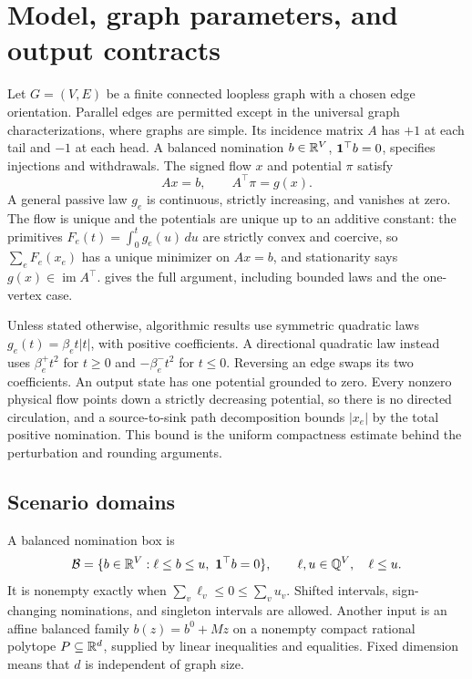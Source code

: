 \section{Model, graph parameters, and output contracts}
\label{sec:main-model}

Let $G=(V,E)$ be a finite connected loopless graph with a chosen edge
orientation. Parallel edges are permitted except in the universal graph
characterizations, where graphs are simple. Its incidence matrix $A$
has $+1$ at each tail and $-1$ at each head. A balanced nomination
$b\in\mathbb{R}^V$, $\mathbf{1}^\top b=0$, specifies injections and withdrawals.
The signed flow $x$ and potential $\pi$ satisfy
\begin{equation}
 Ax=b,\qquad A^\top\pi=g(x).
 \label{eq:main-state}
\end{equation}
A general passive law $g_e$ is continuous, strictly increasing, and
vanishes at zero. The flow is unique and the potentials are unique up
to an additive constant: the primitives
$F_e(t)=\int_0^t g_e(u)\,du$ are strictly convex and coercive, so
$\sum_e F_e(x_e)$ has a unique minimizer on $Ax=b$, and stationarity
says $g(x)\in\operatorname{im}A^\top$. 
gives the full argument, including bounded laws and the one-vertex case.

Unless stated otherwise, algorithmic results use symmetric quadratic
laws $g_e(t)=\beta_e t|t|$, with positive coefficients. A directional
quadratic law instead uses $\beta_e^+t^2$ for $t\ge0$ and
$-\beta_e^-t^2$ for $t\le0$. Reversing an edge swaps its two
coefficients. An output state has one potential grounded to zero.
Every nonzero physical flow points down a strictly decreasing potential,
so there is no directed circulation, and a source-to-sink path
decomposition bounds $|x_e|$ by the total positive nomination. This
bound is the uniform compactness estimate behind the perturbation and
rounding arguments.

\subsection{Scenario domains}

A balanced nomination box is
\begin{equation}
 \mathcal B=\{b\in\mathbb{R}^V:\ell\le b\le u,\ \mathbf{1}^\top b=0\},
 \qquad \ell,u\in\mathbb{Q}^V,\quad \ell\le u.
 \label{eq:main-box}
\end{equation}
It is nonempty exactly when $\sum_v\ell_v\le0\le\sum_vu_v$.
Shifted intervals, sign-changing nominations, and singleton intervals
are allowed. Another input is an affine balanced family
$b(z)=b^0+Mz$ on a nonempty compact rational polytope
$P\subseteq\mathbb{R}^d$, supplied by linear inequalities and equalities.
Fixed dimension means that $d$ is independent of graph size.

